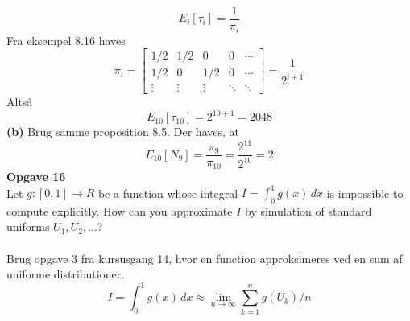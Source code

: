 \documentclass[12pt,a4paper,draft]{report}
\begin{document}
\begin{equation}
E_i[\tau_i]=\frac{1}{\pi_i}
\end{equation}
Fra eksempel 8.16 haves
\begin{equation}
\pi_i=\begin{bmatrix}
1/2 & 1/2	& 0		& 0		& \cdots\\
1/2 & 0		& 1/2	& 0		& \cdots\\
\vdots & \vdots & \vdots & \ddots &\ddots
\end{bmatrix}=\frac{1}{2^{i+1}}
\end{equation}
Altså
\begin{equation}
E_{10}[\tau_{10}]=2^{10+1}=2048
\end{equation}
\textbf{(b)} Brug samme proposition 8.5. Der haves, at
\begin{equation}
E_{10}[N_9]=\frac{\pi_9}{\pi_{10}}=\frac{2^{11}}{2^{10}}=2
\end{equation}
\textbf{Opgave 16}\\
Let $g:[0,1]\to R$ be a function whose integral $I=\int^1_0\!g(x)\,dx$ is impossible to compute explicitly. How can you approximate $I$ by simulation of standard uniforms $U_1,U_2,\ldots$?\\\\
Brug opgave 3 fra kursusgang 14, hvor en function approksimeres ved en sum af uniforme distributioner.
\begin{equation}
I=\int_0^1\!g(x)\,dx\approx \lim_{n\to\infty}\sum_{k=1}^ng(U_k)/n
\end{equation}
\end{document}
